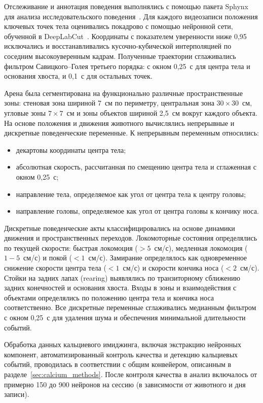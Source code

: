 Отслеживание и аннотация поведения выполнялись с помощью пакета Sphynx для анализа исследовательского поведения~\cite{Plusnin1}. Для каждого видеозаписи положения ключевых точек тела оценивались покадрово с помощью нейронной сети, обученной в DeepLabCut~\cite{Mathis}. Координаты с показателем уверенности ниже 0{,}95 исключались и восстанавливались кусочно-кубической интерполяцией по соседним высокоуверенным кадрам. Полученные траектории сглаживались фильтром Савицкого--Голея третьего порядка: с окном 0{,}25~с для центра тела и основания хвоста, и 0{,}1~с для остальных точек.

Арена была сегментирована на функционально различные пространственные зоны: стеновая зона шириной 7~см по периметру, центральная зона $30 \times 30$~см, угловые зоны $7 \times 7$~см и зоны объектов шириной 2{,}5~см вокруг каждого объекта. На основе положения и движения животного вычислялись непрерывные и дискретные поведенческие переменные. К непрерывным переменным относились:
\begin{itemize}
    \item декартовы координаты центра тела;
    \item абсолютная скорость, рассчитанная по смещению центра тела и сглаженная с окном 0{,}25~с;
    \item направление тела, определяемое как угол от центра тела к центру головы;
    \item направление головы, определяемое как угол от центра головы к кончику носа.
\end{itemize}

Дискретные поведенческие акты классифицировались на основе динамики движения и пространственных переходов. Локомоторные состояния определялись по текущей скорости: быстрая локомоция ($>5$~см/с), медленная локомоция ($1{-}5$~см/с) и покой ($<1$~см/с). Замирание определялось как одновременное снижение скорости центра тела ($<1$~см/с) и скорости кончика носа ($<2$~см/с). Стойки на задних лапах (rearing) выявлялись по транзиторному сближению задних конечностей и основания хвоста. Входы в зоны и взаимодействия с объектами определялись по положению центра тела и кончика носа соответственно. Все дискретные переменные сглаживались медианным фильтром с окном 0{,}25~с для удаления шума и обеспечения минимальной длительности событий.

Обработка данных кальциевого имиджинга, включая экстракцию нейронных компонент, автоматизированный контроль качества и детекцию кальциевых событий, проводилась в соответствии с общим конвейером, описанным в разделе~\ref{sec:calcium_methods}. После контроля качества в анализ включалось от примерно 150 до 900 нейронов на сессию (в зависимости от животного и дня записи).
